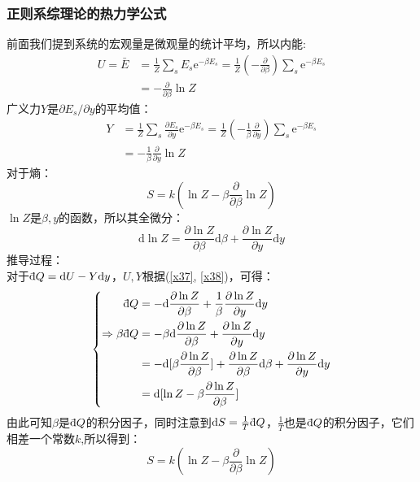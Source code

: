 \documentclass[12pt]{article}
\newcommand \dbar {{\; \bar{} \hspace{-0.3em} \mathrm d}}%
\begin{document}
\subsubsection{正则系综理论的热力学公式}
\noindent
前面我们提到系统的宏观量是微观量的统计平均，所以内能:
\begin{equation}
	\begin{split}
	U=\bar{E}&=\frac{1}{Z}\sum_s E_s \mathrm{e}^{-\beta E_s}=\frac{1}{Z}(-\frac{\partial}{\partial \beta})\sum_s \mathrm{e}^{-\beta E_s}\\
	&=-\frac{\partial}{\partial \beta}\ln Z
\end{split}
\label{x37}
\end{equation}
广义力$Y$是$\partial E_s/\partial y$的平均值：
\begin{equation}
	\begin{split}
		Y&=\frac{1}{Z}\sum_s \frac{\partial E_s}{\partial y}\mathrm{e}^{-\beta E_s}=\frac{1}{Z}(-\frac{1}{\beta}\frac{\partial}{\partial y})\sum_s \mathrm{e}^{-\beta E_s}\\
		&=-\frac{1}{\beta}\frac{\partial}{\partial y}\ln Z
	\end{split}
\label{x38}
\end{equation}
对于熵：
\begin{equation}
	S=k(\ln Z-\beta\frac{\partial}{\partial \beta}\ln Z)
\end{equation}
$\ln Z$是$\beta, y$的函数，所以其全微分：
\begin{equation}
	\mathrm{d}\ln Z=\frac{\partial  \ln Z}{\partial \beta}\mathrm{d}\beta+\frac{\partial \ln Z}{\partial y}\mathrm{d}y
\end{equation}
推导过程：\\
对于$\dbar Q=\mathrm{d}U-Y\mathrm{d}y$，$U, Y$根据(\ref{x37}, \ref{x38})，可得：
\begin{equation}
	\left\{
	\begin{split}
	\dbar Q&=-\mathrm{d}\frac{\partial \ln Z}{\partial \beta}+ \frac{1}{\beta}\frac{\partial \ln Z}{\partial y}\mathrm{d}y\\
	\Rightarrow \beta \dbar Q&=-\beta \mathrm{d}\frac{\partial \ln Z}{\partial \beta}+\frac{\partial \ln Z}{\partial y}\mathrm{d}y\\
	&=-\mathrm{d}[\beta \frac{\partial \ln Z}{\partial \beta}]+\frac{\partial \ln Z}{\partial \beta}\mathrm{d}\beta+\frac{\partial \ln Z}{\partial y}\mathrm{d}y\\
&=\mathrm{d}[\ln Z-\beta\frac{\partial \ln Z}{\partial \beta}]
\end{split}\right.
\end{equation}
由此可知$\beta$是$\dbar Q$的积分因子，同时注意到$\mathrm{d}S=\frac{1}{T}\dbar Q$，$\frac{1}{T}$也是$\dbar Q$的积分因子，它们相差一个常数$k$,所以得到：
\begin{equation}
	S=k(\ln Z-\beta \frac{\partial}{\partial \beta}\ln Z)
\end{equation}
\end{document}
